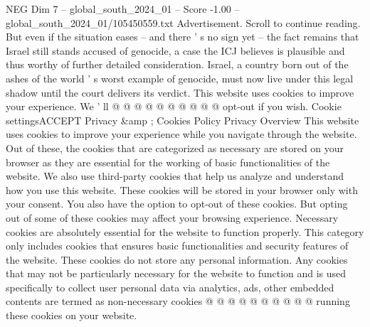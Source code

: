 \begin{textsample}{NEG Dim 7 – global\_south\_2024\_01 – Score -1.00 – global\_south\_2024\_01/105450559.txt}
Advertisement.
Scroll to continue reading.
But even if the situation eases -- and there ' s no sign yet -- the fact remains that Israel still stands accused of genocide, a case the ICJ believes is plausible and thus worthy of further detailed consideration.
Israel, a country born out of the ashes of the world ' s worst example of genocide, must now live under this legal shadow until the court delivers its verdict.
This website uses cookies to improve your experience.
We ' ll @ @ @ @ @ @ @ @ @ @ opt-out if you wish.
Cookie settingsACCEPT Privacy \&amp ; Cookies Policy Privacy Overview This website uses cookies to improve your experience while you navigate through the website.
Out of these, the cookies that are categorized as necessary are stored on your browser as they are essential for the working of basic functionalities of the website.
We also use third-party cookies that help us analyze and understand how you use this website.
These cookies will be stored in your browser only with your consent.
You also have the option to opt-out of these cookies.
But opting out of some of these cookies may affect your browsing experience.
Necessary cookies are absolutely essential for the website to function properly.
This category only includes cookies that ensures basic functionalities and security features of the website.
These cookies do not store any personal information.
Any cookies that may not be particularly necessary for the website to function and is used specifically to collect user personal data via analytics, ads, other embedded contents are termed as non-necessary cookies @ @ @ @ @ @ @ @ @ @ running these cookies on your website.

\end{textsample}
